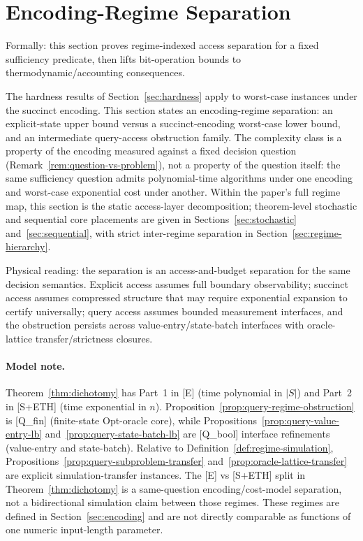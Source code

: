 \section{Encoding-Regime Separation}\label{sec:dichotomy}

Formally: this section proves regime-indexed access separation for a fixed sufficiency predicate, then lifts bit-operation bounds to thermodynamic/accounting consequences.

The hardness results of Section~\ref{sec:hardness} apply to worst-case instances under the succinct encoding. This section states an encoding-regime separation: an explicit-state upper bound versus a succinct-encoding worst-case lower bound, and an intermediate query-access obstruction family. The complexity class is a property of the encoding measured against a fixed decision question (Remark~\ref{rem:question-vs-problem}), not a property of the question itself: the same sufficiency question admits polynomial-time algorithms under one encoding and worst-case exponential cost under another.
Within the paper's full regime map, this section is the static access-layer decomposition; theorem-level stochastic and sequential core placements are given in Sections~\ref{sec:stochastic} and~\ref{sec:sequential}, with strict inter-regime separation in Section~\ref{sec:regime-hierarchy}.

Physical reading: the separation is an access-and-budget separation for the same decision semantics. Explicit access assumes full boundary observability; succinct access assumes compressed structure that may require exponential expansion to certify universally; query access assumes bounded measurement interfaces, and the obstruction persists across value-entry/state-batch interfaces with oracle-lattice transfer/strictness closures.

\paragraph{Model note.} Theorem~\ref{thm:dichotomy} has Part~1 in [E] (time polynomial in $|S|$) and Part~2 in [S+ETH] (time exponential in $n$). Proposition~\ref{prop:query-regime-obstruction} is [Q\_fin] (finite-state Opt-oracle core), while Propositions~\ref{prop:query-value-entry-lb} and~\ref{prop:query-state-batch-lb} are [Q\_bool] interface refinements (value-entry and state-batch). Relative to Definition~\ref{def:regime-simulation}, Propositions~\ref{prop:query-subproblem-transfer} and~\ref{prop:oracle-lattice-transfer} are explicit simulation-transfer instances. The [E] vs [S+ETH] split in Theorem~\ref{thm:dichotomy} is a same-question encoding/cost-model separation, not a bidirectional simulation claim between those regimes. These regimes are defined in Section~\ref{sec:encoding} and are not directly comparable as functions of one numeric input-length parameter.

